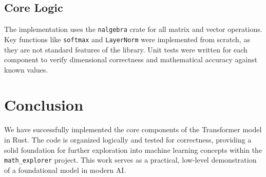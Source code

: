 \documentclass{article}
\begin{document}
\subsection{Core Logic}
The implementation uses the \texttt{nalgebra} crate for all matrix and vector operations. Key functions like \texttt{softmax} and \texttt{LayerNorm} were implemented from scratch, as they are not standard features of the library. Unit tests were written for each component to verify dimensional correctness and mathematical accuracy against known values.

\section{Conclusion}
We have successfully implemented the core components of the Transformer model in Rust. The code is organized logically and tested for correctness, providing a solid foundation for further exploration into machine learning concepts within the \texttt{math\_explorer} project. This work serves as a practical, low-level demonstration of a foundational model in modern AI.



\end{document}
